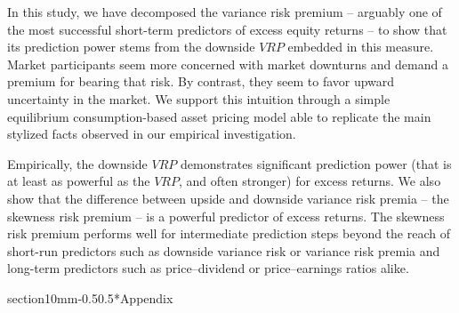 \documentclass[11pt]{article}
\makeatletter
\renewcommand\section{\@startsection%
    {section}{1}{0mm}{-0.5\baselineskip}{0.5\baselineskip}{\bfseries\Large}}
\makeatother
\begin{document}
In this study, we have decomposed the variance risk premium -- arguably one of the most successful short-term predictors of excess equity returns -- to show that its prediction power stems from the downside $VRP$ embedded in this measure. Market participants seem more concerned with market downturns and demand a premium for bearing that risk. By contrast, they seem to favor upward uncertainty in the market. We support this intuition through a simple equilibrium consumption-based asset pricing model able to replicate the main stylized facts observed in our empirical investigation.

Empirically, the downside $VRP$ demonstrates significant prediction power (that is at least as powerful as the $VRP$, and often stronger) for excess returns. We also show that the difference between upside and downside variance risk premia -- the skewness risk premium -- is a powerful predictor of excess returns. The skewness risk premium performs well for intermediate prediction steps beyond the reach of short-run predictors such as downside variance risk or variance risk premia and long-term predictors such as price--dividend or price--earnings ratios alike.


\clearpage
\newpage


%

\singlespace



\clearpage
\newpage

\section*{Appendix}
\end{document}

